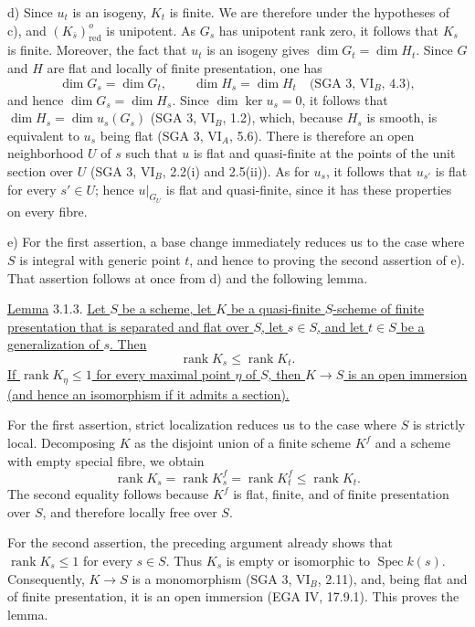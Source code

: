 \smallskip
\noindent
d) Since $u_t$ is an isogeny, $K_t$ is finite.  We are therefore under the
hypotheses of c), and $(K_{\bar s})^o_{\mathrm{red}}$ is unipotent.  As
$G_s$ has unipotent rank zero, it follows that $K_s$ is finite.  Moreover,
the fact that $u_t$ is an isogeny gives
$\dim G_t=\dim H_t$.  Since $G$ and $H$ are flat and locally of finite
presentation, one has
\[
 \dim G_s=\dim G_t,\qquad \dim H_s=\dim H_t
 \quad\text{(SGA 3, VI$_B$, 4.3)},
\]
and hence $\dim G_s=\dim H_s$.  Since $\dim\ker u_s=0$, it follows that
$\dim H_s=\dim u_s(G_s)$ (SGA 3, VI$_B$, 1.2), which, because $H_s$ is
smooth, is equivalent to $u_s$ being flat (SGA 3, VI$_A$, 5.6).  There is
therefore an open neighborhood $U$ of $s$ such that $u$ is flat and
quasi-finite at the points of the unit section over $U$ (SGA 3, VI$_B$,
2.2(i) and 2.5(ii)).  As for $u_s$, it follows that $u_{s'}$ is flat for
every $s'\in U$; hence $u|_{G_U}$ is flat and quasi-finite, since it has
these properties on every fibre.

\smallskip
\noindent
e) For the first assertion, a base change immediately reduces us to the
case where $S$ is integral with generic point $t$, and hence to proving the
second assertion of e).  That assertion follows at once from d) and the
following lemma.

\medskip
\noindent
\underline{Lemma} 3.1.3. \underline{Let $S$ be a scheme, let $K$ be a
quasi-finite $S$-scheme of finite presentation that is separated and flat
over $S$, let $s\in S$, and let $t\in S$ be a generalization of $s$.  Then}
\[
 \operatorname{rank}K_s\leq \operatorname{rank}K_t.
\]
\underline{If $\operatorname{rank}K_\eta\leq1$ for every maximal point
$\eta$ of $S$, then $K\longrightarrow S$ is an open immersion (and hence
an isomorphism if it admits a section).}

For the first assertion, strict localization reduces us to the case where
$S$ is strictly local.  Decomposing $K$ as the disjoint union of a finite
scheme $K^f$ and a scheme with empty special fibre, we obtain
\[
 \operatorname{rank}K_s
 =\operatorname{rank}K^f_s
 =\operatorname{rank}K^f_t
 \leq\operatorname{rank}K_t.
\]
The second equality follows because $K^f$ is flat, finite, and of finite
presentation over $S$, and therefore locally free over $S$.

For the second assertion, the preceding argument already shows that
$\operatorname{rank}K_s\leq1$ for every $s\in S$.  Thus $K_s$ is empty or
isomorphic to $\operatorname{Spec}k(s)$.  Consequently,
$K\longrightarrow S$ is a monomorphism (SGA 3, VI$_B$, 2.11), and, being
flat and of finite presentation, it is an open immersion (EGA IV, 17.9.1).
This proves the lemma.

